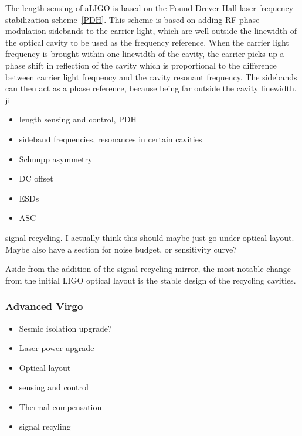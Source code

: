 The length sensing of aLIGO is based on the Pound-Drever-Hall laser frequency stabilization scheme~\ref{PDH}. 
This scheme is based on adding RF phase modulation sidebands to the carrier light, which are well outside the linewidth 
of the optical cavity 
to be used as the frequency reference. When the carrier light frequency is brought within one linewidth of the cavity, 
the carrier picks up a phase shift in reflection of the cavity which is proportional to the difference between carrier light 
frequency and the cavity resonant frequency. The sidebands can then act as a phase reference, because being far outside 
the cavity linewidth. ji


\begin{itemize}
\item length sensing and control, PDH
\item sideband frequencies, resonances in certain cavities
\item Schnupp asymmetry
\item DC offset
\item ESDs
\item ASC
\end{itemize}

signal recycling. I actually think this should maybe just go under optical layout.
Maybe also have a section for noise budget, or sensitivity curve?








Aside from the addition of the signal recycling mirror, the most notable change from the initial LIGO optical 
layout is the stable design of the recycling cavities.


\subsubsection{Advanced Virgo}
\begin{itemize}
\item Sesmic isolation upgrade?
\item Laser power upgrade
\item Optical layout
\item sensing and control
\item Thermal compensation
\item signal recyling
\end{itemize}